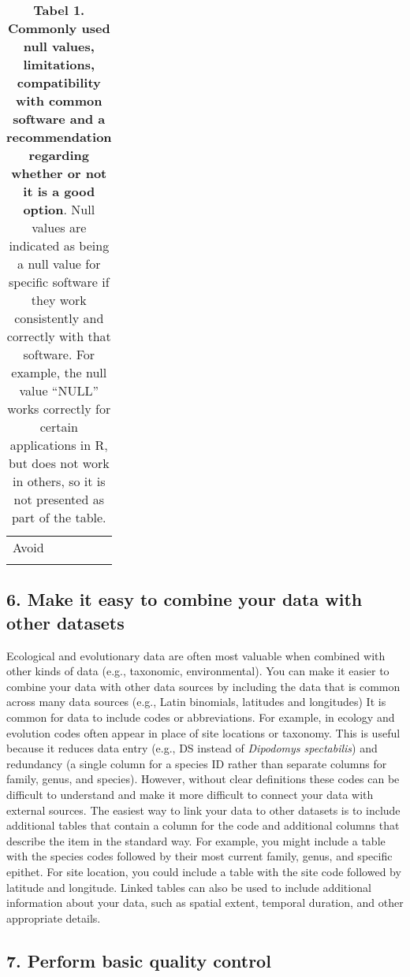 \begin{longtable}[c]{@{}llll@{}}
\begin{minipage}[t]{0.18\columnwidth}
Avoid
\end{minipage}
\\\addlinespace
\bottomrule
\addlinespace
\caption{\textbf{Tabel 1. Commonly used null values, limitations,
compatibility with common software and a recommendation regarding
whether or not it is a good option}. Null values are indicated as being
a null value for specific software if they work consistently and
correctly with that software. For example, the null value ``NULL'' works
correctly for certain applications in R, but does not work in others, so
it is not presented as part of the table.}
\end{longtable}

\subsection{6. Make it easy to combine your data with other
datasets}\label{make-it-easy-to-combine-your-data-with-other-datasets}

Ecological and evolutionary data are often most valuable when combined
with other kinds of data (e.g., taxonomic, environmental). You can make
it easier to combine your data with other data sources by including the
data that is common across many data sources (e.g., Latin binomials,
latitudes and longitudes) It is common for data to include codes or
abbreviations. For example, in ecology and evolution codes often appear
in place of site locations or taxonomy. This is useful because it
reduces data entry (e.g., DS instead of \emph{Dipodomys spectabilis})
and redundancy (a single column for a species ID rather than separate
columns for family, genus, and species). However, without clear
definitions these codes can be difficult to understand and make it more
difficult to connect your data with external sources. The easiest way to
link your data to other datasets is to include additional tables that
contain a column for the code and additional columns that describe the
item in the standard way. For example, you might include a table with
the species codes followed by their most current family, genus, and
specific epithet. For site location, you could include a table with the
site code followed by latitude and longitude. Linked tables can also be
used to include additional information about your data, such as spatial
extent, temporal duration, and other appropriate details.

\subsection{7. Perform basic quality
control}\label{perform-basic-quality-control}

